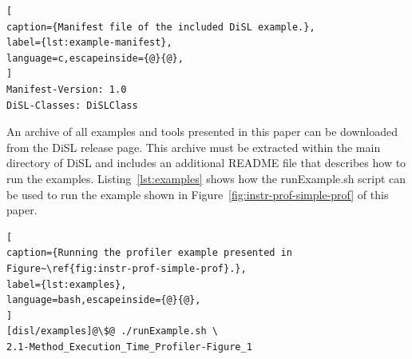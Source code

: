 \documentclass{article}
\newcommand{\brcode}[1]{\textsf{#1}}
\newcommand{\code}[1]{\mbox{\brcode{#1}}}
\begin{document}
\begin{lstlisting}[
caption={Manifest file of the included DiSL example.},
label={lst:example-manifest},
language=c,escapeinside={@}{@},
]
Manifest-Version: 1.0
DiSL-Classes: DiSLClass
\end{lstlisting}


\medskip
An archive of all examples and tools presented in this paper can be downloaded from the DiSL release page.
This archive must be extracted within the main directory of DiSL and includes an additional \code{README} file that describes how to run the examples.
Listing~\ref{lst:examples} shows how the \code{runExample.sh} script can be used to run the example shown in Figure~\ref{fig:instr-prof-simple-prof} of this paper.

\begin{lstlisting}[
caption={Running the profiler example presented in Figure~\ref{fig:instr-prof-simple-prof}.},
label={lst:examples},
language=bash,escapeinside={@}{@},
]
[disl/examples]@\$@ ./runExample.sh \
2.1-Method_Execution_Time_Profiler-Figure_1
\end{lstlisting}
\end{document}
